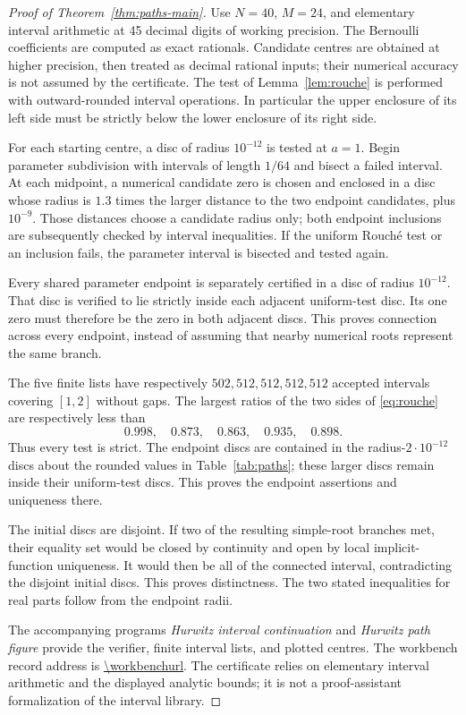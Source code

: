 \begin{proof}[Proof of Theorem~\ref{thm:paths-main}]
Use $N=40$, $M=24$, and elementary interval arithmetic at 45 decimal digits of working precision. The Bernoulli coefficients are computed as exact rationals. Candidate centres are obtained at higher precision, then treated as decimal rational inputs; their numerical accuracy is not assumed by the certificate. The test of Lemma~\ref{lem:rouche} is performed with outward-rounded interval operations. In particular the upper enclosure of its left side must be strictly below the lower enclosure of its right side.

For each starting centre, a disc of radius $10^{-12}$ is tested at $a=1$. Begin parameter subdivision with intervals of length $1/64$ and bisect a failed interval. At each midpoint, a numerical candidate zero is chosen and enclosed in a disc whose radius is $1.3$ times the larger distance to the two endpoint candidates, plus $10^{-9}$. Those distances choose a candidate radius only; both endpoint inclusions are subsequently checked by interval inequalities. If the uniform Rouch\'e test or an inclusion fails, the parameter interval is bisected and tested again.

Every shared parameter endpoint is separately certified in a disc of radius $10^{-12}$. That disc is verified to lie strictly inside each adjacent uniform-test disc. Its one zero must therefore be the zero in both adjacent discs. This proves connection across every endpoint, instead of assuming that nearby numerical roots represent the same branch.

The five finite lists have respectively $502,512,512,512,512$ accepted intervals covering $[1,2]$ without gaps. The largest ratios of the two sides of \eqref{eq:rouche} are respectively less than
\[
 0.998,\quad0.873,\quad0.863,\quad0.935,\quad0.898.
\]
Thus every test is strict. The endpoint discs are contained in the radius-$2\cdot10^{-12}$ discs about the rounded values in Table~\ref{tab:paths}; these larger discs remain inside their uniform-test discs. This proves the endpoint assertions and uniqueness there.

The initial discs are disjoint. If two of the resulting simple-root branches met, their equality set would be closed by continuity and open by local implicit-function uniqueness. It would then be all of the connected interval, contradicting the disjoint initial discs. This proves distinctness. The two stated inequalities for real parts follow from the endpoint radii.

The accompanying programs \emph{Hurwitz interval continuation} and \emph{Hurwitz path figure} provide the verifier, finite interval lists, and plotted centres. The workbench record address is \url{\workbenchurl}. The certificate relies on elementary interval arithmetic and the displayed analytic bounds; it is not a proof-assistant formalization of the interval library.
\end{proof}

